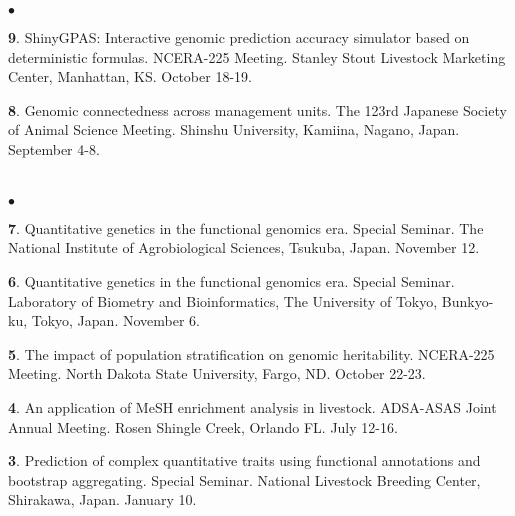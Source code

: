 \documentclass[margin,line,10pt]{res}
\newenvironment{list2}{
  \begin{list}{$\bullet$}{%
      \setlength{\itemsep}{0in}
      \setlength{\parsep}{0in} \setlength{\parskip}{0in}
      \setlength{\topsep}{0in} \setlength{\partopsep}{0in} 
      \setlength{\leftmargin}{0.2in}}}{\end{list}}
\begin{document}
\begin{resume}
\begin{list2}
  \item [{\bf 9}.] ShinyGPAS: Interactive genomic prediction accuracy simulator based on deterministic formulas. NCERA-225 Meeting. Stanley Stout Livestock Marketing Center, Manhattan, KS. October 18-19. 

      \vspace{0.5cm}

  \item [{\bf 8}.] Genomic connectedness across management units. The 123rd Japanese Society of Animal Science Meeting. Shinshu University, Kamiina, Nagano, Japan. September 4-8.

\end{list2}  

    
\section{}
\begin{list2}

  \item [{\bf 7}.] Quantitative genetics in the functional genomics era. Special Seminar. The National Institute of Agrobiological Sciences, Tsukuba, Japan. November 12. 

  \vspace{0.5cm}

\item [{\bf 6}.] Quantitative genetics in the functional genomics era. Special Seminar. Laboratory of Biometry and Bioinformatics, The University of Tokyo, Bunkyo-ku, Tokyo, Japan. November 6. 

  \vspace{0.5cm}
  
\item [{\bf 5}.] The impact of population stratification on genomic heritability. NCERA-225 Meeting. North Dakota State University, Fargo, ND. October 22-23. 

  \vspace{0.5cm}

\item [{\bf 4}.] An application of MeSH enrichment analysis in livestock. ADSA-ASAS Joint Annual Meeting. Rosen Shingle Creek, Orlando FL. July 12-16.  

  \vspace{0.5cm}
  
\item [{\bf 3}.] Prediction of complex quantitative traits using functional annotations and bootstrap aggregating. Special Seminar. National Livestock Breeding Center, Shirakawa, Japan. January 10. 
\end{list2}  


\end{resume}
\end{document}
